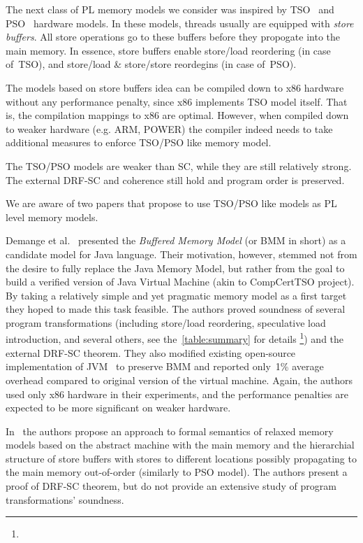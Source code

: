 The next class of PL memory models we consider 
was inspired by TSO~\cite{Sewell-al:CACM10} and PSO~\cite{Sparc:94} 
hardware models. In these models, threads usually 
are equipped with \emph{store buffers}.
All store operations go to these buffers before they 
propogate into the main memory.  
In essence, store buffers enable 
store/load reordering (in case of~TSO),
and store/load \& store/store reordegins (in case of~PSO).

The models based on store buffers idea 
can be compiled down to x86 hardware without any 
performance penalty, since x86 implements TSO model itself.
That is, the compilation mappings to x86 are optimal.
However, when compiled down to weaker hardware (e.g. ARM, POWER)
the compiler indeed needs to take additional measures 
to enforce TSO/PSO like memory model.

The TSO/PSO models are weaker than SC, while 
they are still relatively strong.
The external DRF-SC and coherence still hold
and program order is preserved.

We are aware of two papers that propose to use TSO/PSO 
like models as PL level memory models.

Demange et al.~\cite{Demange-al:POPL13} presented 
the \emph{Buffered Memory Model} (or BMM in short)
as a candidate model for Java language.
Their motivation, however, stemmed not from the desire 
to fully replace the Java Memory Model, but rather 
from the goal to build a verified version of 
Java Virtual Machine (akin to CompCertTSO project).
By taking a relatively simple and yet pragmatic memory model
as a first target they hoped to made this task feasible. 
The authors proved soundness of several program transformations
(including store/load reordering, speculative load introduction,
and several others, see 
the~\cref{table:summary} for details%
\footnote{})
and the external DRF-SC theorem. 
They also modified existing open-source implementation of 
JVM~\cite{Pizlo-al:ECCS10} to preserve BMM and 
reported only~1\% average overhead 
compared to original version of the virtual machine. 
Again, the authors used only x86 hardware in their 
experiments, and the performance penalties 
are expected to be more significant on weaker hardware.   

In~\cite{Boudol-al:POPL09} the authors propose 
an approach to formal semantics of relaxed memory models 
based on the abstract machine with the main memory 
and the hierarchial structure of store buffers 
with stores to different locations possibly 
propagating to the main memory out-of-order
(similarly to PSO model).
The authors present a proof of DRF-SC theorem,
but do not provide an extensive study 
of program transformations' soundness.

